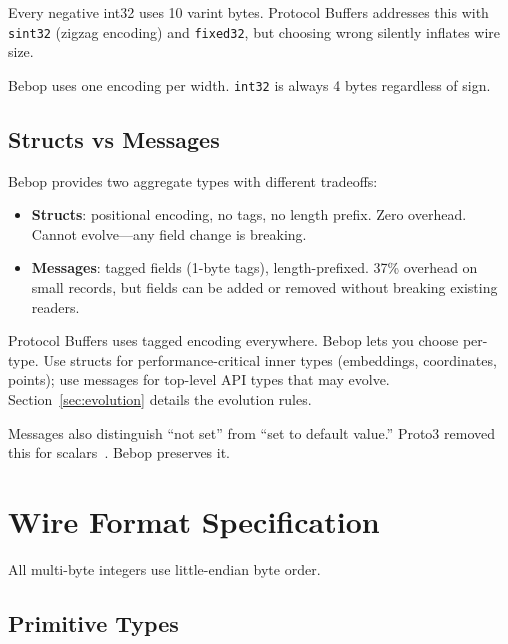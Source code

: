 \documentclass[10pt,onecolumn]{article}
\begin{document}
Every negative int32 uses 10 varint bytes. Protocol Buffers addresses this with \texttt{sint32} (zigzag encoding) and \texttt{fixed32}, but choosing wrong silently inflates wire size.

Bebop uses one encoding per width. \texttt{int32} is always 4 bytes regardless of sign.

\subsection{Structs vs Messages}

Bebop provides two aggregate types with different tradeoffs:

\begin{itemize}[leftmargin=2em,itemsep=4pt,topsep=6pt]
\item \textbf{Structs}: positional encoding, no tags, no length prefix. Zero overhead. Cannot evolve---any field change is breaking.
\item \textbf{Messages}: tagged fields (1-byte tags), length-prefixed. 37\% overhead on small records, but fields can be added or removed without breaking existing readers.
\end{itemize}

Protocol Buffers uses tagged encoding everywhere. Bebop lets you choose per-type. Use structs for performance-critical inner types (embeddings, coordinates, points); use messages for top-level API types that may evolve. Section~\ref{sec:evolution} details the evolution rules.

Messages also distinguish ``not set'' from ``set to default value.'' Proto3 removed this for scalars~\cite{proto3-presence}. Bebop preserves it.


\newpage
\section{Wire Format Specification}

All multi-byte integers use little-endian byte order.

\subsection{Primitive Types}
\end{document}
